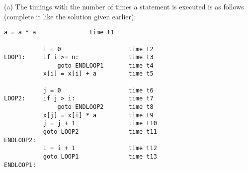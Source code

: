

(a) 
The timings with the number of times a statement is executed
is as follows (complete it like the solution given earlier):
\begin{Verbatim}[frame=single,commandchars]
           a = a * a               time t1

           i = 0                   time t2
LOOP1:     if i >= n:              time t3
               goto ENDLOOP1       time t4
           x[i] = x[i] + a         time t5

           j = 0                   time t6
LOOP2:     if j > i:               time t7
               goto ENDLOOP2       time t8
           x[j] = x[i] * a         time t9
           j = j + 1               time t10
           goto LOOP2              time t11
ENDLOOP2:
           i = i + 1               time t12
           goto LOOP1              time t13
ENDLOOP1:
\end{Verbatim}
